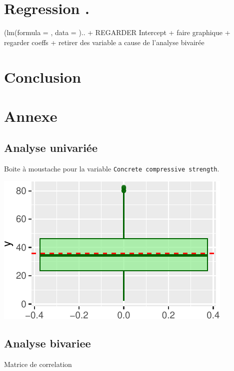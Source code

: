 \documentclass[
  12pt,
]{article}
\begin{document}
\section{Regression .}\label{regression-.}

(lm(formula = , data = ).. + REGARDER Intercept + faire graphique +
regarder coeffs + retirer des variable a cause de l'analyse bivairée

\section{Conclusion}\label{conclusion}

\section{Annexe}\label{annexe}

\subsection{Analyse univariée}\label{analyse-univariuxe9e}

Boite à moustache pour la variable
\texttt{Concrete\ compressive\ strength}.

\begin{center}\includegraphics{rmd_final_files/figure-latex/unnamed-chunk-24-1} \end{center}

\subsection{Analyse bivariee}\label{analyse-bivariee}

Matrice de correlation
\end{document}
